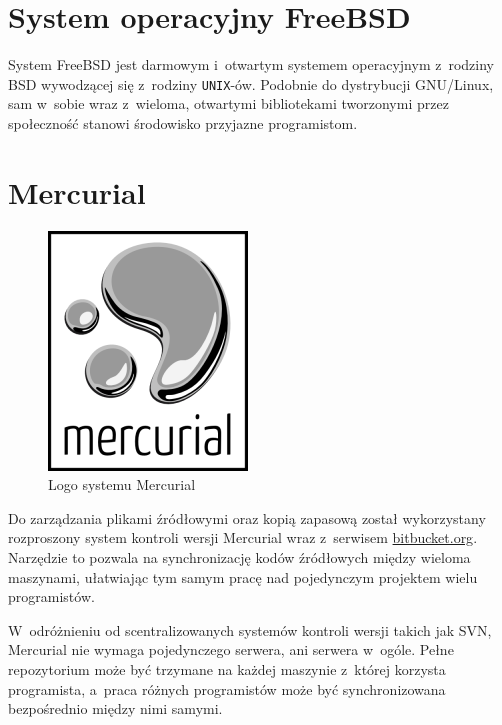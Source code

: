 \section{System operacyjny FreeBSD}
\par
System FreeBSD jest darmowym i~otwartym systemem operacyjnym z~rodziny BSD wywodzącej się z~rodziny \texttt{UNIX}-ów. Podobnie do dystrybucji GNU/Linux, sam w~sobie wraz z~wieloma, otwartymi bibliotekami tworzonymi przez społeczność stanowi środowisko przyjazne programistom.

\section{Mercurial}
\begin{figure}
\begin{center}
\includegraphics[scale=0.50]{img/mercurial_logo.png}
\end{center}
\caption{Logo systemu Mercurial}
\end{figure}
\par
Do zarządzania plikami źródłowymi oraz kopią zapasową został wykorzystany rozproszony system kontroli wersji Mercurial wraz z~serwisem \url{bitbucket.org}. Narzędzie to pozwala na synchronizację kodów źródłowych między wieloma maszynami, ułatwiając tym samym pracę nad pojedynczym projektem wielu programistów.
\par
W~odróżnieniu od scentralizowanych systemów kontroli wersji takich jak SVN, Mercurial nie wymaga pojedynczego serwera, ani serwera w~ogóle. Pełne repozytorium może być trzymane na każdej maszynie z~której korzysta programista, a~praca różnych programistów może być synchronizowana bezpośrednio między nimi samymi\cite{version-control-example}.

